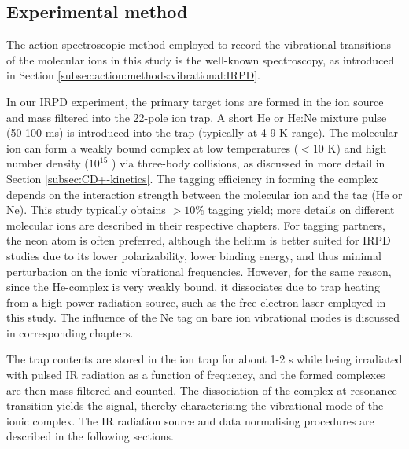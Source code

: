 \subsection{Experimental method}
\label{subsec:IRPD}

The action spectroscopic method employed to record the vibrational transitions of the molecular ions in this study is the well-known  spectroscopy, as introduced in Section \ref{subsec:action:methods:vibrational:IRPD}.

In our IRPD experiment, the primary target ions are formed in the ion source and mass filtered into the 22-pole ion trap. A short He or He:Ne mixture pulse (50-100 ms) is introduced into the trap (typically at 4-9 K range). The molecular ion can form a weakly bound complex at low temperatures ($< 10$ K) and high number density ($10^{15}$ \percc ) via three-body collisions, as discussed in more detail in Section \ref{subsec:CD+-kinetics}. The tagging efficiency in forming the complex depends on the interaction strength between the molecular ion and the tag (He or Ne). This study typically obtains $> 10 \%$ tagging yield; more details on different molecular ions are described in their respective chapters. For tagging partners, the neon atom is often preferred, although the helium is better suited for IRPD studies due to its lower polarizability, lower binding energy, and thus  minimal perturbation on the ionic vibrational frequencies. However, for the same reason, since the He-complex is very weakly bound, it dissociates due to trap heating from a high-power radiation source, such as the free-electron laser employed in this study. The influence of the Ne tag on bare ion vibrational modes is discussed in corresponding chapters.

The trap contents are stored in the ion trap for about 1-2 s while being irradiated with pulsed IR radiation as a function of frequency, and the formed complexes are then mass filtered and counted. The dissociation of the complex at resonance transition yields the signal, thereby characterising the vibrational mode of the ionic complex. The IR radiation source and data normalising procedures are described in the following sections.
